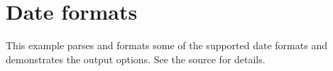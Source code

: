 \documentclass[a4paper]{article}
\begin{document}
\section*{Date formats}

This example parses and formats some of the supported date formats and
demonstrates the output options. See the source for details.
\nocite{*}

\printbibliography[env=simple,title={Examples}]
\end{document}
